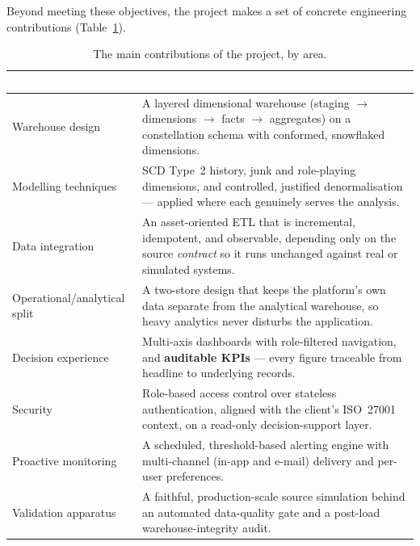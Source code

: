 Beyond meeting these objectives, the project makes a set of concrete engineering contributions
(Table~\ref{tab:concl-contributions}).

\begin{table}[H]
\centering
\caption{The main contributions of the project, by area.}
\label{tab:concl-contributions}
\renewcommand{\arraystretch}{1.35}
\begin{tabularx}{\linewidth}{|>{\raggedright\arraybackslash}p{4.0cm}|>{\raggedright\arraybackslash}X|}
\hline
\rowcolor{tblheader}
\textcolor{white}{\textbf{Area}} & \textcolor{white}{\textbf{Contribution}} \\
\hline
Warehouse design & A layered dimensional warehouse (staging $\rightarrow$ dimensions $\rightarrow$ facts
$\rightarrow$ aggregates) on a constellation schema with conformed, snowflaked dimensions. \\
Modelling techniques & SCD Type~2 history, junk and role-playing dimensions, and controlled, justified
denormalisation --- applied where each genuinely serves the analysis. \\
Data integration & An asset-oriented ETL that is incremental, idempotent, and observable, depending only
on the source \emph{contract} so it runs unchanged against real or simulated systems. \\
Operational/analytical split & A two-store design that keeps the platform's own data separate from the
analytical warehouse, so heavy analytics never disturbs the application. \\
Decision experience & Multi-axis dashboards with role-filtered navigation, and \textbf{auditable KPIs} ---
every figure traceable from headline to underlying records. \\
Security & Role-based access control over stateless authentication, aligned with the client's ISO~27001
context, on a read-only decision-support layer. \\
Proactive monitoring & A scheduled, threshold-based alerting engine with multi-channel (in-app and
e-mail) delivery and per-user preferences. \\
Validation apparatus & A faithful, production-scale source simulation behind an automated data-quality
gate and a post-load warehouse-integrity audit. \\
\hline
\end{tabularx}
\end{table}

